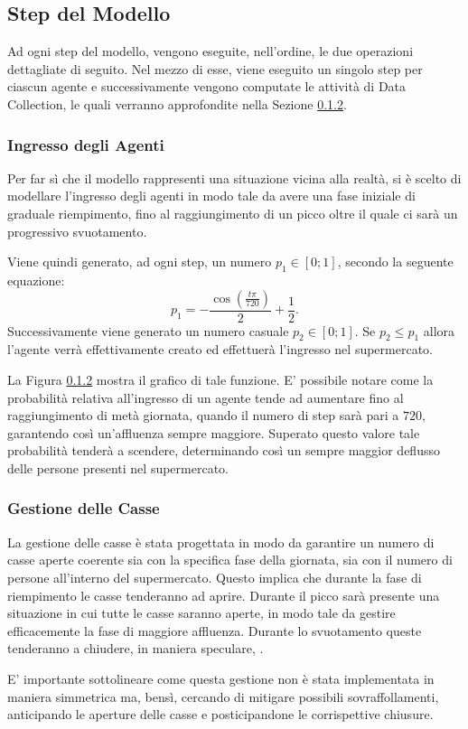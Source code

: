
\subsection{Step del Modello} 
Ad ogni step del modello, vengono eseguite, nell'ordine, le due operazioni dettagliate di seguito.
Nel mezzo di esse, viene eseguito un singolo step per ciascun agente e successivamente vengono computate le attività di Data Collection, le quali verranno approfondite nella Sezione \ref{}.

\subsubsection{Ingresso degli Agenti}
Per far sì che il modello rappresenti una situazione vicina alla realtà, si è scelto di modellare l'ingresso degli agenti in modo tale da avere una fase iniziale di graduale riempimento, fino al raggiungimento di un picco oltre il quale ci sarà un progressivo svuotamento.

Viene quindi generato, ad ogni step, un numero $p_1 \in [0;1]$, secondo la seguente equazione:
\begin{equation*}
p_1 = -\frac{\cos\left(\frac{t\pi}{720}\right)}{2}+\frac{1}{2} .
\end{equation*}
Successivamente viene generato un numero casuale $p_2 \in [0;1]$. 
Se $p_2 \leq p_1$ allora l'agente verrà effettivamente creato ed effettuerà l'ingresso nel supermercato.

La Figura \ref{} mostra il grafico di tale funzione. 
E' possibile notare come la probabilità relativa all'ingresso di un agente tende ad aumentare fino al raggiungimento di metà giornata, quando il numero di step sarà pari a $720$, garantendo così un'affluenza sempre maggiore. 
Superato questo valore tale probabilità tenderà a scendere, determinando così un sempre maggior deflusso delle persone presenti nel supermercato.

\subsubsection{Gestione delle Casse}
La gestione delle casse è stata progettata in modo da garantire un numero di casse aperte coerente sia con la specifica fase della giornata, sia con il numero di persone all'interno del supermercato.
Questo implica che durante la fase di riempimento le casse tenderanno ad aprire. 
Durante il picco sarà presente una situazione in cui tutte le casse saranno aperte, in modo tale da gestire efficacemente la fase di maggiore affluenza. 
Durante lo svuotamento queste tenderanno a chiudere, in maniera speculare, . 

E' importante sottolineare come questa gestione non è stata implementata in maniera simmetrica ma, bensì, cercando di mitigare possibili sovraffollamenti, anticipando le aperture delle casse e posticipandone le corrispettive chiusure. 
